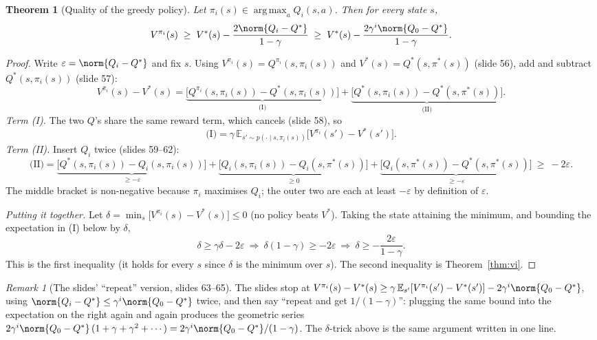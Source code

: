 \documentclass[11pt,a4paper]{article}
\newcommand{\E}{\mathbb{E}}
\DeclareMathOperator*{\argmax}{arg\,max}
\theoremstyle{plain}
\newtheorem{theorem}{Theorem}[section]
\theoremstyle{definition}
\theoremstyle{remark}
\newtheorem*{remark}{Remark}
\begin{document}
\begin{theorem}[Quality of the greedy policy]\label{thm:greedy}
Let $\pi_i(s)\in\argmax_aQ_i(s,a)$. Then for every state $s$,
\[
V^{\pi_i}(s)\;\ge\;V^*(s)-\frac{2\norm{Q_i-Q^*}}{1-\gamma}\;\ge\;V^*(s)-\frac{2\gamma^i\norm{Q_0-Q^*}}{1-\gamma}.
\]
\end{theorem}
\begin{proof}
Write $\varepsilon=\norm{Q_i-Q^*}$ and fix $s$. Using $V^{\pi_i}(s)=Q^{\pi_i}(s,\pi_i(s))$ and $V^*(s)=Q^*(s,\pi^*(s))$ (slide 56), add and subtract $Q^*(s,\pi_i(s))$ (slide 57):
\[
V^{\pi_i}(s)-V^*(s)=\underbrace{\big[Q^{\pi_i}(s,\pi_i(s))-Q^*(s,\pi_i(s))\big]}_{\text{(I)}}+\underbrace{\big[Q^*(s,\pi_i(s))-Q^*(s,\pi^*(s))\big]}_{\text{(II)}}.
\]
\emph{Term (I).} The two $Q$'s share the same reward term, which cancels (slide 58), so
\[
\text{(I)}=\gamma\,\E_{s'\sim p(\cdot\mid s,\pi_i(s))}\big[V^{\pi_i}(s')-V^*(s')\big].
\]
\emph{Term (II).} Insert $Q_i$ twice (slides 59--62):
\[
\text{(II)}=\underbrace{\big[Q^*(s,\pi_i(s))-Q_i(s,\pi_i(s))\big]}_{\ge-\varepsilon}+\underbrace{\big[Q_i(s,\pi_i(s))-Q_i(s,\pi^*(s))\big]}_{\ge0}+\underbrace{\big[Q_i(s,\pi^*(s))-Q^*(s,\pi^*(s))\big]}_{\ge-\varepsilon}\ \ge\ -2\varepsilon.
\]
The middle bracket is non-negative because $\pi_i$ maximises $Q_i$; the outer two are each at least $-\varepsilon$ by definition of $\varepsilon$.

\emph{Putting it together.} Let $\delta=\min_s\big[V^{\pi_i}(s)-V^*(s)\big]\le0$ (no policy beats $V^*$). Taking the state attaining the minimum, and bounding the expectation in (I) below by $\delta$,
\[
\delta\ge\gamma\delta-2\varepsilon\ \Longrightarrow\ \delta(1-\gamma)\ge-2\varepsilon\ \Longrightarrow\ \delta\ge-\frac{2\varepsilon}{1-\gamma}.
\]
This is the first inequality (it holds for every $s$ since $\delta$ is the minimum over $s$). The second inequality is Theorem~\ref{thm:vi}.
\end{proof}

\begin{remark}[The slides' ``repeat'' version, slides 63--65]
The slides stop at $V^{\pi_i}(s)-V^*(s)\ge\gamma\,\E_{s'}[V^{\pi_i}(s')-V^*(s')]-2\gamma^i\norm{Q_0-Q^*}$, using $\norm{Q_i-Q^*}\le\gamma^i\norm{Q_0-Q^*}$ twice, and then say ``repeat and get $1/(1-\gamma)$'': plugging the same bound into the expectation on the right again and again produces the geometric series $2\gamma^i\norm{Q_0-Q^*}\,(1+\gamma+\gamma^2+\cdots)=2\gamma^i\norm{Q_0-Q^*}/(1-\gamma)$. The $\delta$-trick above is the same argument written in one line.
\end{remark}
\end{document}
